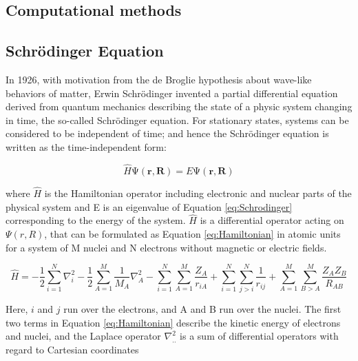 \begin{refsection}
\section{Computational methods}

\subsection{Schr\"odinger Equation}
In 1926, with motivation from the de Broglie hypothesis about wave-like behaviors of matter, Erwin Schr\"odinger invented a partial differential equation derived from quantum mechanics describing the state of a physic system changing in time,\cite{c1:Schrodinger1926} the so-called Schr\"odinger equation. For stationary states, systems can be considered to be independent of time; and hence the Schr\"{o}dinger equation is written as the time-independent form:

\begin{equation}
\widehat{H}\mathrm{\Psi(\mathbf{r},\mathbf{R})} = E\mathrm{\Psi(\mathbf{r},\mathbf{R})}
\label{eq:Schrodinger}
\end{equation}

\noindent where $\widehat{H}$ is the Hamiltonian operator including electronic and nuclear parts of the physical system and E is an eigenvalue of Equation \ref{eq:Schrodinger} corresponding to the energy of the system.  $\widehat{H}$ is a differential operator acting on $\Psi(r,R)$, that can be formulated as Equation \ref{eq:Hamiltonian} in atomic units for a system of M nuclei and N electrons without magnetic or electric fields.


\begin{equation}
\widehat{H} = -\frac{1}{2}\sum_{i=1}^{N} \nabla_{i}^{2} -\frac{1}{2}\sum_{A=1}^{M} \frac{1}{M_A}\nabla_{A}^{2} - \sum_{i=1}^{N}\sum_{A=1}^{M}\frac{Z_A}{r_{iA}} + \sum_{i=1}^{N}\sum_{j>i}^{N} \frac{1}{r_{ij}} + \sum_{A=1}^{M}\sum_{B>A}^{M} \frac{Z_A Z_B}{R_{AB}}
\label{eq:Hamiltonian}
\end{equation}

\noindent Here, $ i $ and $ j $ run over the electrons, and A and B run over the nuclei. The first two terms in Equation \ref{eq:Hamiltonian} describe the kinetic energy of electrons and nuclei, and the Laplace operator $\nabla_{..}^{2}$ is a sum of differential operators with regard to Cartesian coordinates


\end{refsection}
